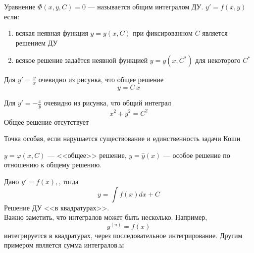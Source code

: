 \begin{Note}
    Уравнение $\Phi(x, y, C) = 0$ --- называется общим интегралом ДУ. $y' = f(x, y)$ если:
    \begin{enumerate}
        \item всякая неявная функция $y = y(x, C)$ при фиксированном $C$ является решением ДУ
        \item всякое решение задаётся неявной функцией $y = y(x, C^*)$ для некоторого $C^*$
    \end{enumerate}
\end{Note}

\begin{Example}
    Для $y' = \frac{y}{x}$ очевидно из рисунка, что общее решение
    \[
        y = C \, x
    \]
\end{Example}

\begin{Example}
    Для $y' = -\frac{x}{y}$ очевидно из рисунка, что общий интеграл 
    \[
        x^2 + y^2 = C^2
    \]
    Общее решение отсутствует
\end{Example}

Точка особая, если нарушается существование и единственность задачи Коши
\begin{Note}
    $y = \varphi(x, C)$ --- <<общее>> решение, $y = \hat{y}(x)$ --- особое решение по отношению к общему решению.
\end{Note}

\begin{Note}
    Дано $y' = f(x),$, тогда 
    \[
        y = \int{f(x)dx} + C
    \] 
    Решение ДУ <<в квадратурах>>.\\
    Важно заметить, что интегралов может быть несколько. Например, 
    \[
        y^{(n)} = f(x)
    \] 
    интегрируется в квадратурах, через последовательное интегрирование. Другим примером является сумма интегралов.ы
\end{Note}